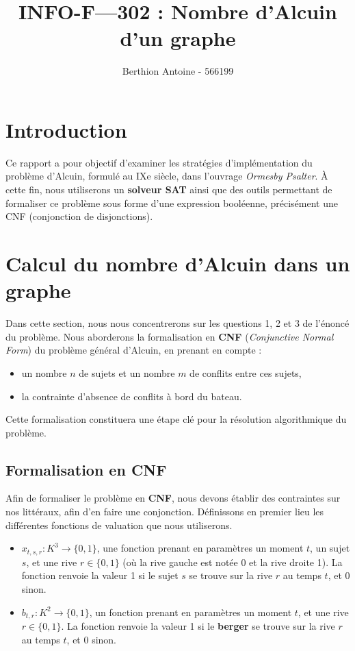 \documentclass{article}
\title{INFO-F—302 : Nombre d'Alcuin d'un graphe }
\author{Berthion Antoine - 566199}
\begin{document}
\maketitle

\section{Introduction}
\label{sec:introduction}

Ce rapport a pour objectif d'examiner les stratégies d'implémentation du problème d'Alcuin, formulé au IXe siècle, dans l'ouvrage \textit{Ormesby Psalter}. À cette fin, nous utiliserons un \textbf{solveur SAT} ainsi que des outils permettant de formaliser ce problème sous forme d'une expression booléenne, précisément une CNF (conjonction de disjonctions).

\section{Calcul du nombre d'Alcuin dans un graphe}
\label{sec:alcuin_number}

\noindent Dans cette section, nous nous concentrerons sur les questions 1, 2 et 3 de l’énoncé du problème. Nous aborderons la formalisation en \textbf{CNF} (\textit{Conjunctive Normal Form}) du problème général d’Alcuin, en prenant en compte :

\begin{itemize} 
\item un nombre $n$ de sujets et un nombre $m$ de conflits entre ces sujets,
\item la contrainte d’absence de conflits à bord du bateau.
\end{itemize}

\noindent Cette formalisation constituera une étape clé pour la résolution algorithmique du problème.

\subsection{Formalisation en \textbf{CNF}}
\label{subsec:cnf}

\noindent Afin de formaliser le problème en \textbf{CNF}, nous devons établir des contraintes sur nos littéraux, afin d'en faire une conjonction. Définissons en premier lieu les différentes fonctions de valuation que nous utiliserons.

\begin{itemize}
    \item \( x_{t,s,r} : K^3 \to \{0, 1\} \), une fonction prenant en paramètres un moment \( t \), un sujet \( s \), et une rive \( r \in \{0, 1\} \) (où la rive gauche est notée 0 et la rive droite 1). La fonction renvoie la valeur 1 si le sujet \( s \) se trouve sur la rive \( r \) au temps \( t \), et 0 sinon.
    \item \( b_{t,r} : K^2 \to \{0, 1\} \), un fonction prenant en paramètres un moment \( t \), et une rive \( r \in \{0, 1\} \). La fonction renvoie la valeur 1 si le \textbf{berger} se trouve sur la rive \( r \) au temps \( t \), et 0 sinon.
\end{itemize}
\end{document}

